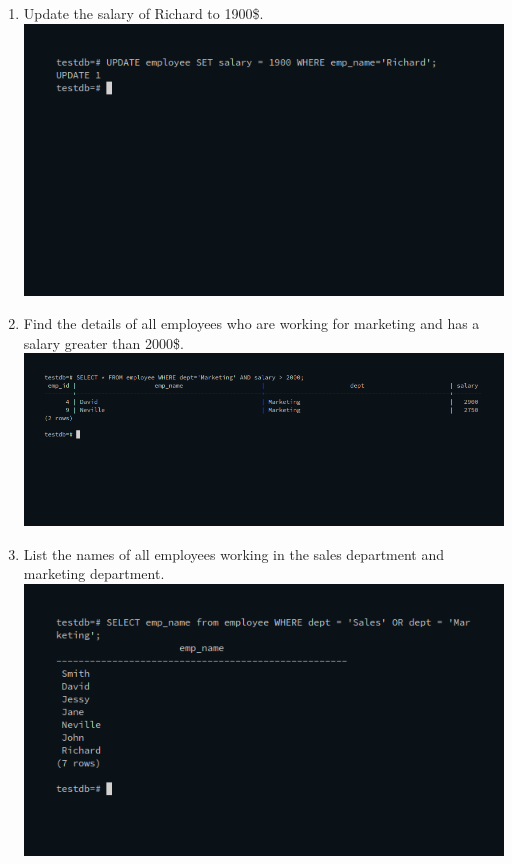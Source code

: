 \documentclass[10pt,a4paper,titlepage]{report}
\begin{document}
{\begin{enumerate}
		\item Update the salary of Richard to 1900\$.\newline
			\includegraphics[width=\linewidth]{../Images/Basics/7.png}\newline
		\item Find the details of all employees who are working for marketing and has a salary greater than	2000\$.\newline
			\includegraphics[width=\linewidth]{../Images/Basics/8.png}\newline
		\item List the names of all employees working in the sales department and marketing department.\newline
			\includegraphics[width=\linewidth]{../Images/Basics/9.png}\newline

\end{enumerate}}
\end{document}

